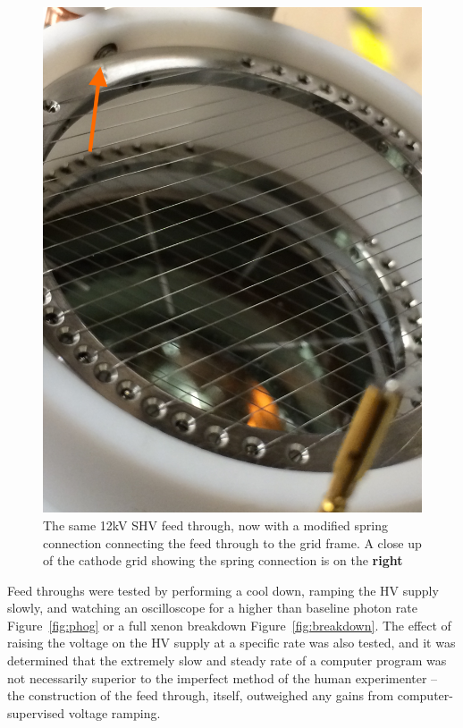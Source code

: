 \begin{figure}[htbp]
\begin{center}
\includegraphics[width=\halffig]{figures/testbed/ft2_2.jpg}
\caption{The same 12kV SHV feed through, now with a modified spring connection connecting the feed through to the grid frame. A close up of the cathode grid showing the spring connection is on the \textbf{right}}
\label{fig:ft2_1}
\end{center}
\end{figure}


Feed throughs were tested by performing a cool down, ramping the \ac{HV} supply slowly, and watching an oscilloscope for a higher than baseline photon rate Figure~\ref{fig:phog} or a full xenon breakdown Figure~\ref{fig:breakdown}. The effect of raising the voltage on the \ac{HV} supply at a specific rate was also tested, and it was determined that the extremely slow and steady rate of a computer program was not necessarily superior to the imperfect method of the human experimenter -- the construction of the feed through, itself, outweighed any gains from computer-supervised voltage ramping.  


